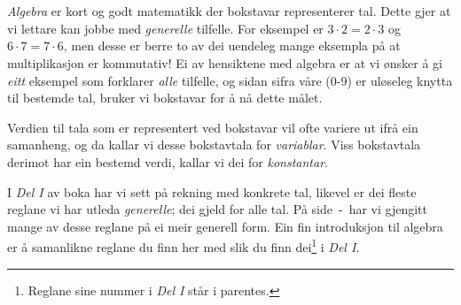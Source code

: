 



\section{\algintro}
\textit{Algebra} er kort og godt matematikk der bokstavar representerer tal. Dette gjer at vi lettare kan jobbe med \textsl{generelle} tilfelle. For eksempel er $ {3\cdot 2=2\cdot3} $ og $ 6\cdot7=7\cdot6 $, men desse er berre to av dei uendeleg mange eksempla på at multiplikasjon er kommutativ! Ei av hensiktene med algebra er at vi ønsker å gi \textsl{eitt} eksempel som forklarer \textsl{alle} tilfelle, og sidan sifra våre (0-9) er uløseleg knytta til bestemde tal, bruker vi bokstavar for å nå dette målet. \vsk

Verdien til tala som er representert ved bokstavar vil ofte variere ut ifrå ein samanheng, og da kallar vi desse bokstavtala for \textit{variablar}. Viss bokstavtala derimot har ein bestemd verdi, kallar vi dei for \textit{konstantar}.

\vsk

I \textsl{Del I} av boka har vi sett på rekning med konkrete tal, likevel er dei fleste reglane vi har utleda \textsl{generelle}; dei gjeld for alle tal. På side \pageref{regstart}\,-\,\pageref{regslutt} har vi gjengitt mange av desse reglane på ei meir generell form. Ein fin introduksjon til algebra er å samanlikne reglane du finn her med slik du finn dei\footnote{Reglane sine nummer i \textsl{Del I} står i parentes.} i \textsl{Del I}. \vsk

\regv
\label{regstart}
\reg[\adkom\;(\ref{adkom}) \label{adkomalg}]{\vs
\[ a+ b =b+a \]
}
\eks{ \vsb
\[ 7+ 5=5+7 \]
} \vsk \vsk

\reg[\gangkom\;(\ref{gangkom})]{\vs
	\[ a\cdot b =b\cdot a \]
}
\eks[1]{ \vsb
	\[ 9\cdot 8=8\cdot9 \]
}
\eks[2]{ \vsb
\[  8\cdot a= a\cdot 8  \]
}
\newpage
{}
\vsk 

\reg[\brdef\;(\ref{brdef})]{
\[ a:b=\frac{a}{b} \]
}
\eks[]{ \vs
\[a:2= \frac{a}{2} \]
}
 \vsk 


